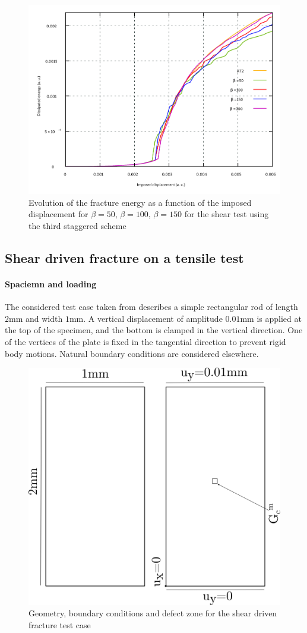 \begin{figure}[H]
  \centering
  \includegraphics[width=10.cm]{../chapter_003_ef_micromorphic/figures/DissipatedEnergies.pdf}
  \caption{Evolution of the fracture energy as a function of the imposed
  displacement for \(\beta=50\), \(\beta=100\), \(\beta=150\) for the
  shear test using the third staggered
  scheme}
  \label{fig:micromorphic_damage:beta2}
\end{figure}

\subsection{Shear driven fracture on a tensile test}

\paragraph{Spaciemn and loading}

The considered test case taken from \cite{alessi_phase-field_2020} describes a simple rectangular rod
of length $2$mm and width $1$mm.
A vertical displacement of amplitude $0.01$mm is applied at the top of the specimen, and the
bottom is clamped in the vertical direction.
One of the vertices
of the plate is fixed in the tangential direction to prevent rigid body motions.
Natural
boundary conditions are considered elsewhere.

\begin{figure}[H]
  \centering
  \includegraphics[width=8.cm]{../chapter_003_ef_micromorphic/drawings/alessi_mesh.png}
  \caption{Geometry, boundary conditions and defect zone for the shear driven fracture test case}
  \label{fig:micromorphic_damage:alessi_mesh}
\end{figure}

